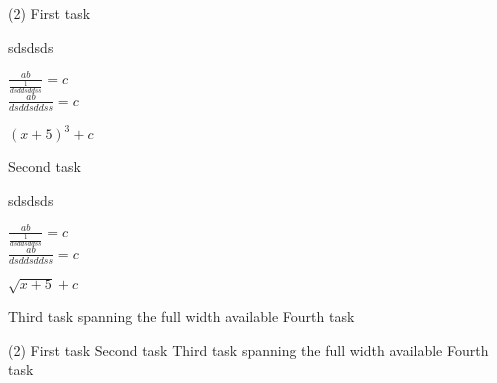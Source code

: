 \setcounter{exercise}{322}
\begin{tasks}[start=320](2)
    \task First task
          \begin{exercise}  
  \begin{envSolution}
 
      sdsdsds


          
   $ \frac{ab}{ \frac{1} { dsdds d ds s  }}=c  $\\
   $ \frac{ab}{dsdds d ds s}=c  $\\
      
  
  \begin{shortsolution}
  	$ (x+5)^3+c $
  \end{shortsolution}
  \end{envSolution}%
 \end{exercise}
 
    \task Second task
\begin{exercise}
	
    
  \begin{envSolution}
 
      sdsdsds


          
   $ \frac{ab}{ \frac{1} { dsdds d ds s  }}=c  $\\
   $ \frac{ab}{dsdds d ds s}=c  $\\
      
  \begin{shortsolution}
  	$ \sqrt{x+5}+c $
  \end{shortsolution}
  
  \end{envSolution}%

\end{exercise}

 
    \task Third task spanning the full width available
    \task Fourth task
 \end{tasks}


 \begin{tasks}(2)
    \task First task
    \task Second task
    \task Third task spanning the full width available
    \task Fourth task
 \end{tasks}



\clearpage 


